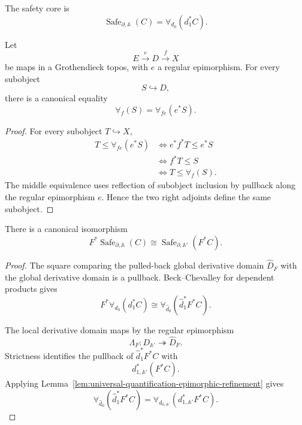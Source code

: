 The safety core is
\[
    \operatorname{Safe}_{\partial,\mathbb A}(C)
    =
    \forall_{d_0}
    \left(
        d_1^\ast C
    \right).
\]

\begin{lemma}
\label{lem:universal-quantification-epimorphic-refinement}
Let
\[
    E\xrightarrow{e}D\xrightarrow{f}X
\]
be maps in a Grothendieck topos, with \(e\) a regular epimorphism. For every
subobject
\[
    S\hookrightarrow D,
\]
there is a canonical equality
\[
    \forall_f(S)
    =
    \forall_{fe}(e^\ast S).
\]
\end{lemma}

\begin{proof}
For every subobject \(T\hookrightarrow X\),
\[
\begin{aligned}
    T\leq\forall_{fe}(e^\ast S)
    &\iff
    e^\ast f^\ast T\leq e^\ast S
    \\
    &\iff
    f^\ast T\leq S
    \\
    &\iff
    T\leq\forall_f(S).
\end{aligned}
\]
The middle equivalence uses reflection of subobject inclusion by pullback
along the regular epimorphism \(e\). Hence the two right adjoints define the
same subobject.
\end{proof}

\begin{theorem}
\label{thm:safety-core-commutes-restriction}
There is a canonical isomorphism
\[
    F^\ast
    \operatorname{Safe}_{\partial,\mathbb A}(C)
    \cong
    \operatorname{Safe}_{\partial,\mathbb A'}
    (F^\ast C).
\]
\end{theorem}

\begin{proof}
The square comparing the pulled-back global derivative domain
\(\widehat D_F\) with the global derivative domain is a pullback.
Beck--Chevalley for dependent products gives
\[
    F^\ast
    \forall_{d_0}
    \left(
        d_1^\ast C
    \right)
    \cong
    \forall_{\widehat d_0}
    \left(
        \widehat d_1^\ast F^\ast C
    \right).
\]

The local derivative domain maps by the regular epimorphism
\[
    \Lambda_F:
    D_{\mathbb A'}\twoheadrightarrow\widehat D_F.
\]
Strictness identifies the pullback of
\(\widehat d_1^\ast F^\ast C\) with
\[
    d_{1,\mathbb A'}^\ast(F^\ast C).
\]
Applying
Lemma~\ref{lem:universal-quantification-epimorphic-refinement}
gives
\[
    \forall_{\widehat d_0}
    \left(
        \widehat d_1^\ast F^\ast C
    \right)
    =
    \forall_{d_{0,\mathbb A'}}
    \left(
        d_{1,\mathbb A'}^\ast F^\ast C
    \right).
\]
\end{proof}

